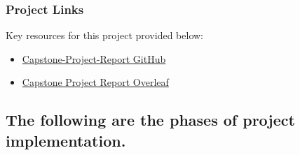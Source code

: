 \documentclass[runningheads]{llncs}
\begin{document}
\subsubsection*{Project Links}
Key resources for this project provided below:

\begin{itemize}
    \item \href{https://github.com/alvaroquintero28/Capstone-Project-Report}{Capstone-Project-Report GitHub}
    \item \href{https://es.overleaf.com/read/zqgzcfntnwbz#9bc8ce}
    {Capstone Project Report Overleaf}
\end{itemize}

\subsection{The following are the phases of project implementation.}
\end{document}
